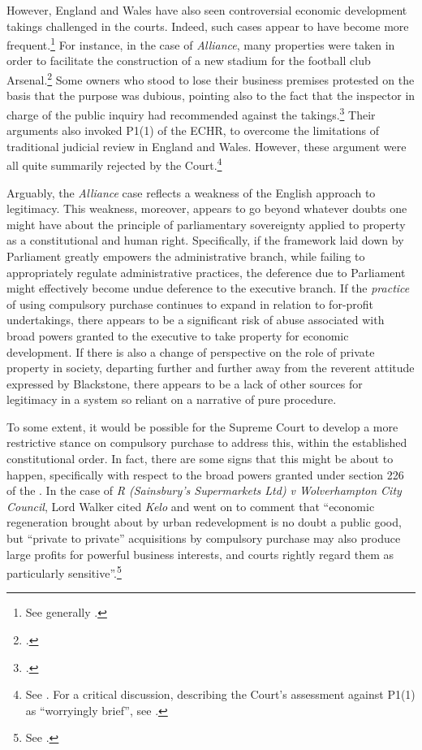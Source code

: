 However, England and Wales have also seen controversial economic development takings challenged in the courts. Indeed, such cases appear to have become more frequent.\footnote{See generally \cite{gray11}.} For instance, in the case of {\it Alliance}, many properties were taken in order to facilitate the construction of a new stadium for the football club Arsenal.\footcite{alliance06} Some owners who stood to lose their business premises protested on the basis that the purpose was dubious, pointing also to the fact that the inspector in charge of the public inquiry had recommended against the takings.\footcite[6-7]{alliance06} Their arguments also invoked P1(1) of the ECHR, to overcome the limitations of traditional judicial review in England and Wales. However, these argument were all quite summarily rejected by the Court.\footnote{See \cite[6-7]{alliance06}. For a critical discussion, describing the Court's assessment against P1(1) as ``worryingly brief'', see \cite[26]{gray11}.}

Arguably, the {\it Alliance} case reflects a weakness of the English approach to legitimacy. This weakness, moreover, appears to go beyond whatever doubts one might have about the principle of parliamentary sovereignty applied to property as a constitutional and human right. Specifically, if the framework laid down by Parliament greatly empowers the administrative branch, while failing to appropriately regulate administrative practices, the deference due to Parliament might effectively become undue deference to the executive branch. If the {\it practice} of using compulsory purchase continues to expand in relation to for-profit undertakings, there appears to be a significant risk of abuse associated with broad powers granted to the executive to take property for economic development. If there is also a change of perspective on the role of private property in society, departing further and further away from the reverent attitude expressed by Blackstone, there appears to be a lack of other sources for legitimacy in a system so reliant on a narrative of pure procedure.

To some extent, it would be possible for the Supreme Court to develop a more restrictive stance on compulsory purchase to address this, within the established constitutional order. In fact, there are some signs that this might be about to happen, specifically with respect to the broad powers granted under section 226 of the \cite{tcpa90}. In the case of {\it R (Sainsbury's Supermarkets Ltd) v Wolverhampton City Council}, Lord Walker cited {\it Kelo} and went on to comment that ``economic regeneration brought about by urban redevelopment is no doubt a public good, but ``private to private'' acquisitions by compulsory purchase may also produce large profits for powerful business interests, and courts rightly regard them as particularly sensitive''.\footnote{See \cite[82]{sainsbury10}.}

